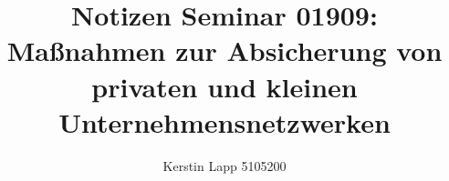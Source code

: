 \documentclass[11pt]{article}
\title{Notizen Seminar 01909: Maßnahmen zur Absicherung von privaten und kleinen Unternehmensnetzwerken }
\author{Kerstin Lapp 5105200}
\begin{document}
\maketitle
\newpage















\nocite{*}




\newpage

\end{document}
